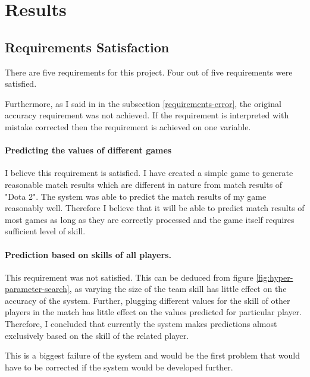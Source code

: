 \documentclass[12pt,a4paper]{book}
\begin{document}
\section{Results}
\subsection{Requirements Satisfaction}
There are five requirements for this project.
Four out of five requirements were satisfied.

Furthermore, as I said in in the subsection \ref{requirements-error}, the original accuracy requirement was not achieved.
If the requirement is interpreted with mistake corrected then the requirement is achieved on one variable.

\paragraph{Predicting the values of different games}
I believe this requirement is satisfied.
I have created a simple game to generate reasonable match results which are different in nature from match results of "Dota 2".
The system was able to predict the match results of my game reasonably well.
Therefore I believe that it will be able to predict match results of most games as long as they are correctly processed and the game itself requires sufficient level of skill.

\paragraph{Prediction based on skills of all players.}
This requirement was not satisfied.
This can be deduced from figure \ref{fig:hyper-parameter-search}, as varying the size of the team skill has little effect on the accuracy of the system.
Further, plugging different values for the skill of other players in the match has little effect on the values predicted for particular player.
Therefore, I concluded that currently the system makes predictions almost exclusively based on the skill of the related player.

This is a biggest failure of the system and would be the first problem that would have to be corrected if the system would be developed further.
\end{document}
